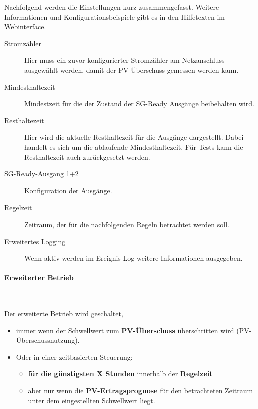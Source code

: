 \documentclass[a4paper,10pt]{article}
\begin{document}
\begin{multicols*}{2}
    Nachfolgend werden die Einstellungen kurz zusammengefasst. Weitere Informationen und Konfigurationsbeispiele gibt es in den Hilfetexten
    im Webinterface.
    
   	\begin{description}
    \item[Stromzähler] Hier muss ein zuvor konfigurierter Stromzähler am Netzanschluss ausgewählt werden, damit der PV-Überschuss gemessen werden kann.
    \item[Mindesthaltezeit] Mindestzeit für die der Zustand der SG-Ready Ausgänge beibehalten wird.
    \item[Resthaltezeit] Hier wird die aktuelle Resthaltezeit für die Ausgänge dargestellt. Dabei handelt es sich um die ablaufende Mindesthaltezeit. Für Tests kann die Resthaltezeit auch zurückgesetzt werden.
    \item[SG-Ready-Ausgang 1+2] Konfiguration der Ausgänge.
    \item[Regelzeit] Zeitraum, der für die nachfolgenden Regeln betrachtet werden soll.
    \item[Erweitertes Logging] Wenn aktiv werden im Ereignis-Log weitere Informationen ausgegeben. 
   	\end{description}

    \paragraph{Erweiterter Betrieb}\ \\
    \vspace{-0.5cm}

    Der erweiterte Betrieb wird geschaltet,
    \begin{itemize}
    \item immer wenn der Schwellwert zum \textbf{PV-Überschuss} überschritten wird (PV-Überschussnutzung).
    \item Oder in einer zeitbasierten Steuerung:
    \begin{itemize}
    \item \textbf{für die günstigsten X Stunden} innerhalb der \textbf{Regelzeit}
    \item aber nur wenn die \textbf{PV-Ertragsprognose} für den betrachteten Zeitraum unter dem eingestellten Schwellwert liegt.
    \end{itemize}
   	\end{itemize}
    

\end{multicols*}
\end{document}
